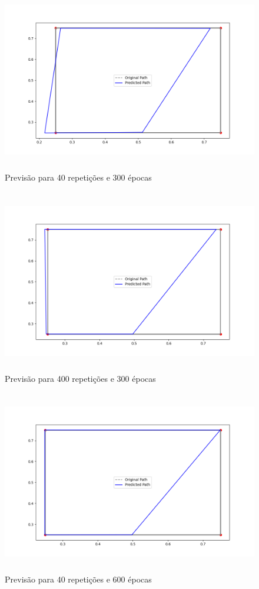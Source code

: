\documentclass[12 pt]{article}
\begin{document}
\begin{enumerate}
    \begin{figure}[H]
        \caption{Previsão para 40 repetições e 300 épocas}
           \centering
           \includegraphics[height=8cm]{Item_4_40_300.png}
    \end{figure}

    \begin{figure}[H]
        \caption{Previsão para 400 repetições e 300 épocas}
           \centering
           \includegraphics[height=8cm]{Item_4_400_300.png}
    \end{figure}

    \begin{figure}[H]
        \caption{Previsão para 40 repetições e 600 épocas}
           \centering
           \includegraphics[height=8cm]{Item_4_40_600.png}
    \end{figure}



\end{enumerate}
\end{document}
